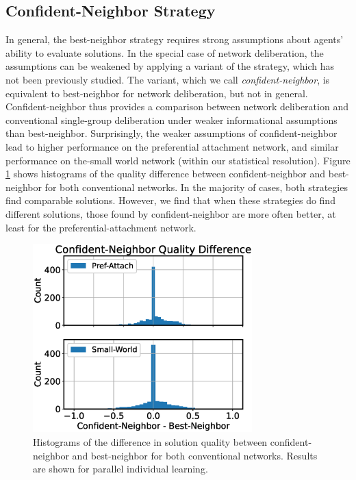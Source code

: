 \subsection{Confident-Neighbor Strategy}

In general, the best-neighbor strategy requires strong assumptions about agents' ability to evaluate solutions. In the special case of network deliberation, the assumptions can be weakened by applying a variant of the strategy, which has not been previously studied. The variant, which we call {\em confident-neighbor}, is equivalent to best-neighbor for network deliberation, but not in general. Confident-neighbor thus provides a comparison between network deliberation and conventional single-group deliberation under weaker informational assumptions than best-neighbor. Surprisingly, the weaker assumptions of confident-neighbor lead to higher performance on the preferential attachment network, and similar performance on the-small world network (within our statistical resolution). Figure \ref{fig:results-confident} shows histograms of the quality difference between confident-neighbor and best-neighbor for both conventional networks. In the majority of cases, both strategies find comparable solutions. However, we find that when these strategies do find different solutions, those found by confident-neighbor are more often better, at least for the preferential-attachment network.

\begin{figure}
    \label{fig:results-confident}
    \centering
    \includegraphics[width=3.33in]{fig/NetDelibABM/fig-results-confident.eps}
\caption{Histograms of the difference in solution quality between confident-neighbor and best-neighbor for both conventional networks.
Results are shown for parallel individual learning.}
\end{figure}

